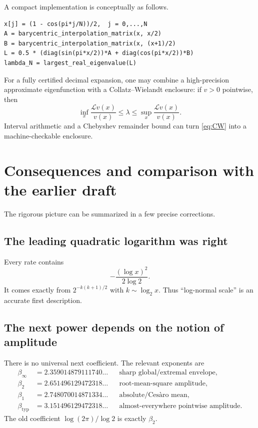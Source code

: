 \documentclass[11pt,oneside]{article}
\theoremstyle{definition}
\theoremstyle{remark}
\newcommand{\Lop}{\mathcal L}
\begin{document}
A compact implementation is conceptually as follows.

\begin{lstlisting}[style=pseudo,caption={Chebyshev collocation for the Perron eigenvalue}]
x[j] = (1 - cos(pi*j/N))/2,  j = 0,...,N
A = barycentric_interpolation_matrix(x, x/2)
B = barycentric_interpolation_matrix(x, (x+1)/2)
L = 0.5 * (diag(sin(pi*x/2))*A + diag(cos(pi*x/2))*B)
lambda_N = largest_real_eigenvalue(L)
\end{lstlisting}

For a fully certified decimal expansion, one may combine a high-precision approximate
eigenfunction with a Collatz--Wielandt enclosure:
if $v>0$ pointwise, then
\begin{equation}\label{eq:CW}
 \inf_x\frac{\Lop v(x)}{v(x)}
 \le\lambda\le
 \sup_x\frac{\Lop v(x)}{v(x)}.
\end{equation}
Interval arithmetic and a Chebyshev remainder bound can turn \eqref{eq:CW} into a
machine-checkable enclosure.

\section{Consequences and comparison with the earlier draft}\label{sec:comparison}

The rigorous picture can be summarized in a few precise corrections.

\subsection{The leading quadratic logarithm was right}

Every rate contains
\[
 -\frac{(\log x)^2}{2\log2}.
\]
It comes exactly from
$2^{-k(k+1)/2}$ with $k\sim\log_2x$.  Thus ``log-normal scale'' is an accurate
first description.

\subsection{The next power depends on the notion of amplitude}

There is no universal next coefficient.  The relevant exponents are
\begin{align*}
 \beta_\infty&=2.359014879111740\ldots
 &&\text{sharp global/extremal envelope},\\
 \beta_2&=2.651496129472318\ldots
 &&\text{root-mean-square amplitude},\\
 \beta_1&=2.748070014871334\ldots
 &&\text{absolute/Ces\`aro mean},\\
 \beta_{\mathrm{typ}}&=3.151496129472318\ldots
 &&\text{almost-everywhere pointwise amplitude}.
\end{align*}
The old coefficient $\log(2\pi)/\log2$ is exactly $\beta_2$.
\end{document}

